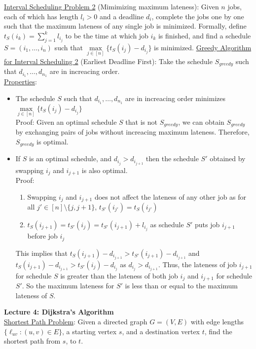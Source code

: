 \documentclass{article}
\begin{document}
\underline{Interval Scheduling Problem 2} (Mimimizing maximum lateness): Given $n$ jobs, each of which has length $l_i > 0$ and a deadline $d_i$, complete the jobs one by one such that the maximum lateness of any single job is minimized. Formally, define $t_S(i_k) = \sum_{j = 1}^{k}l_{i_j}$ to be the time at which job $i_k$ is finished, and find a schedule $S = (i_1, \dots, i_n)$ such that $\underset{{j \in [n]}}{\max}\{t_S(i_j) - d_{i_j}\}$ is minimized.
\underline{Greedy Algorithm for Interval Scheduling 2} (Earliest Deadline First): Take the schedule $S_{greedy}$ such that $d_{i_1},\dots,d_{n_1}$ are in increacing order. \\[1.0ex]
\underline{Properties}:
\begin{itemize}
    \item The schedule $S$ such that $d_{i_1},\dots,d_{n_1}$ are in increacing order minimizes $\underset{{j \in [n]}}{\max}\{t_S(i_j) - d_{i_j}\}$ \\
    Proof: Given an optimal schedule $S$ that is not $S_{greedy}$, we can obtain $S_{greedy}$ by exchanging pairs of jobs without increacing maximum lateness. Therefore, $S_{greedy}$ is optimal.
    \item If $S$ is an optimal schedule, and $d_{i_j} > d_{i_{j + 1}}$ then the schedule $S'$ obtained by swapping $i_j$ and $i_{j + 1}$ is also optimal.\\
    Proof: 
    \begin{enumerate}
        \item Swapping $i_j$ and $i_{j + 1}$ does not affect the lateness of any other job as for all $j' \in [n] \setminus \{j, j + 1\}$, $t_{S'}(i_{j'}) = t_{S}(i_{j'})$
        \item $t_S(i_{j + 1}) = t_{S'}(i_{j}) = t_{S'}(i_{j + 1}) + l_{i_j}$ as schedule $S'$ puts job $i_{j + 1}$ before job $i_j$
    \end{enumerate}
    This implies that $t_S(i_{j + 1}) - d_{i_{j + 1}} > t_{S'}(i_{j + 1}) - d_{i_{j + 1}} $ and  $t_S(i_{j + 1}) - d_{i_{j + 1}} > t_{S'}(i_{j}) - d_{i_{j}} $ as $d_{i_j} > d_{i_{j + 1}}$. Thus, the lateness of job $i_{j + 1}$ for schedule $S$ is greater than the lateness of both job $i_j$ and $i_{j + 1}$ for schedule $S'$. So the maximum lateness for $S'$ is less than or equal to the maximum lateness of $S$.
\end{itemize}

\textbf{Lecture 4: Dijkstra's Algorithm} \\[1.0ex]
\underline{Shortest Path Problem}: Given a directed graph $G = (V, E)$ with edge lengths $\{\ell_{uv}: (u, v) \in E \}$, a starting vertex $s$, and a destination vertex $t$, find the shortest path from $s$, to $t$.
\end{document}
